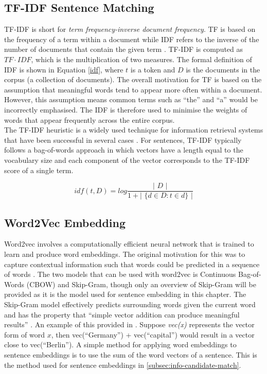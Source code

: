 \subsection{TF-IDF Sentence Matching}
\label{subsec:info-tfidf}
TF-IDF is short for \textit{term frequency-inverse document frequency}. TF is based on the frequency of a term within a document while IDF refers to the inverse of the number of documents that contain the given term \cite{robertson2004understanding}. TF-IDF is computed as $TF\cdot IDF$, which is the multiplication of two measures. The formal definition of IDF is shown in Equation \ref{idf}, where $t$ is a token and $D$ is the documents in the corpus (a collection of documents). The overall motivation for TF is based on the assumption that meaningful words tend to appear more often within a document. However, this assumption means common terms such as ``the'' and ``a'' would be incorrectly emphasised. The IDF is therefore used to minimise the weights of words that appear frequently across the entire corpus. \\
The TF-IDF heuristic is a widely used technique for information retrieval systems that have been successful in several cases \cite{tfidf-explain}. For sentences, TF-IDF typically follows a bag-of-words approach in which vectors have a length equal to the vocabulary size and each component of the vector corresponds to the TF-IDF score of a single term.

\begin{equation}
\label{idf}
idf( t, D ) = log \frac{ \text{| } D \text{ |} }{ 1 + \text{| } \{ d \in D : t \in d \} \text{ |} }
\end{equation}

\subsection{Word2Vec Embedding}
\label{subsec:info-w2v}
Word2vec involves a computationally efficient neural network that is trained to learn and produce word embeddings. The original motivation for this was to capture contextual information such that words could be predicted in a sequence of words \cite{mikolov2013efficient}. The two models that can be used with word2vec is Continuous Bag-of-Words (CBOW) and Skip-Gram, though only an overview of Skip-Gram will be provided as it is the model used for sentence embedding in this chapter. The Skip-Gram model effectively predicts surrounding words given the current word and has the property that ``simple vector addition can produce meaningful results'' \cite{mikolov2013distributed}. An example of this provided in \cite{mikolov2013distributed}. Suppose \textit{vec(x)} represents the vector form of word $x$, then vec(``Germany'') + vec(``capital'') would result in a vector close to vec(``Berlin''). A simple method for applying word embeddings to sentence embeddings is to use the sum of the word vectors of a sentence. This is the method used for sentence embeddings in \ref{subsec:info-candidate-match}.

